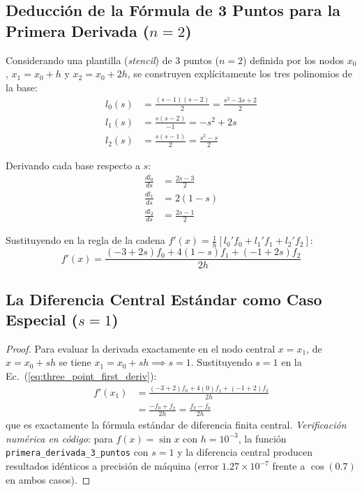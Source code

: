 \documentclass[11pt, a4paper]{article}
\begin{document}
\subsection{Deducción de la Fórmula de 3 Puntos para la Primera Derivada ($n=2$)}

Considerando una plantilla (\textit{stencil}) de 3 puntos ($n=2$) definida por los nodos $x_0$, $x_1 = x_0 + h$ y $x_2 = x_0 + 2h$, se construyen explícitamente los tres polinomios de la base:
\begin{align}
	l_0(s) &= \frac{(s - 1)(s - 2)}{2} = \frac{s^2 - 3s + 2}{2} \\
	l_1(s) &= \frac{s (s - 2)}{-1} = -s^2 + 2s \\
	l_2(s) &= \frac{s (s - 1)}{2} = \frac{s^2 - s}{2}
\end{align}

Derivando cada base respecto a $s$:
\begin{align}
	\frac{d l_0}{ds} &= \frac{2s - 3}{2} \label{eq:dl0_ds} \\
	\frac{d l_1}{ds} &= 2(1 - s) \label{eq:dl1_ds} \\
	\frac{d l_2}{ds} &= \frac{2s - 1}{2} \label{eq:dl2_ds}
\end{align}

Sustituyendo en la regla de la cadena $f'(x) = \frac{1}{h} [ l_0' f_0 + l_1' f_1 + l_2' f_2 ]$:
\begin{equation}
	f'(x) = \frac{(-3 + 2s) f_0 + 4(1 - s) f_1 + (-1 + 2s) f_2}{2h}
	\label{eq:three_point_first_deriv}
\end{equation}

\subsection{La Diferencia Central Estándar como Caso Especial ($s=1$)}

\begin{proof}
	Para evaluar la derivada exactamente en el nodo central $x = x_1$, de $x = x_0 + sh$ se tiene $x_1 = x_0 + sh \implies s = 1$. Sustituyendo $s=1$ en la Ec.~(\ref{eq:three_point_first_deriv}):
	\begin{align}
		f'(x_1) &= \frac{(-3 + 2) f_0 + 4(0) f_1 + (-1 + 2) f_2}{2h} \nonumber \\
		&= \frac{-f_0 + f_2}{2h} = \frac{f_2 - f_0}{2h}
	\end{align}
	que es exactamente la fórmula estándar de diferencia finita central. \emph{Verificación numérica en código}: para $f(x) = \sin x$ con $h = 10^{-3}$, la función \texttt{primera\_derivada\_3\_puntos} con $s=1$ y la diferencia central producen resultados idénticos a precisión de máquina (error $1.27\times10^{-7}$ frente a $\cos(0.7)$ en ambos casos).
\end{proof}
\end{document}
